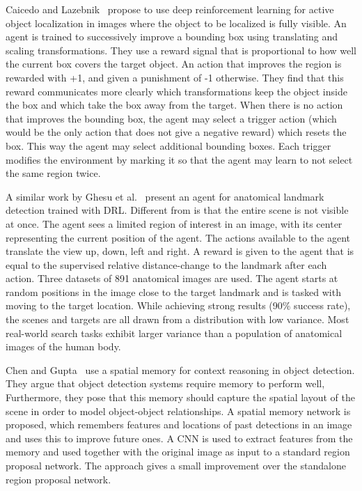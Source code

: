 Caicedo and Lazebnik~\cite{caicedo_active_2015} propose to use deep reinforcement learning for active object localization in images where the object to be localized is fully visible.
An agent is trained to successively improve a bounding box using translating and scaling transformations.
They use a reward signal that is proportional to how well the current box covers the target object.
An action that improves the region is rewarded with +1, and given a punishment of -1 otherwise.
They find that this reward communicates more clearly which transformations keep the object inside the box and which take the box away from the target.
When there is no action that improves the bounding box, the agent may select a trigger action (which would be the only action that does not give a negative reward) which resets the box.
This way the agent may select additional bounding boxes.
Each trigger modifies the environment by marking it so that the agent may learn to not select the same region twice. %

A similar work by Ghesu et al.~\cite{ghesu_artificial_2016} present an agent for anatomical landmark detection trained with DRL.
Different from \cite{caicedo_active_2015} is that the entire scene is not visible at once.
The agent sees a limited region of interest in an image, with its center representing the current position of the agent.
The actions available to the agent translate the view up, down, left and right.
A reward is given to the agent that is equal to the supervised relative distance-change to the landmark after each action.
Three datasets of 891 anatomical images are used.
The agent starts at random positions in the image close to the target landmark and is tasked with moving to the target location.
While achieving strong results (90\% success rate), the scenes and targets are all drawn from a distribution with low variance.
Most real-world search tasks exhibit larger variance than a population of anatomical images of the human body.


Chen and Gupta~\cite{chen_memory_2017} use a spatial memory for context reasoning in object detection.
They argue that object detection systems require memory to perform well,
Furthermore, they pose that this memory should capture the spatial layout of the scene in order to model object-object relationships.
A spatial memory network is proposed, which remembers features and locations of past detections in an image and uses this to improve future ones.
A CNN is used to extract features from the memory and used together with the original image as input to a standard region proposal network.
The approach gives a small improvement over the standalone region proposal network.

